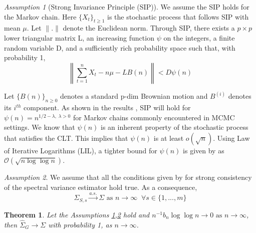 \documentclass[11pt]{article}
\newtheorem{theorem}{Theorem}
\theoremstyle{remark}
\newtheorem{ass}{Assumption}
\begin{document}
\begin{ass}[Strong Invariance Principle (SIP)] \label{ass:sip}
    We assume the SIP holds for the Markov chain. Here $\{X_t\}_{t\geq 1}$ is the stochastic process that follows SIP with mean $\mu$. Let $\|.\|$ denote the Euclidean norm. Through SIP, there exists a $p \times p$ lower triangular matrix L, an increasing function $\psi$ on the integers, a finite random variable D, and a  sufficiently rich probability space such that, with probability 1, \\
  $$\left\|\sum_{t=1}^{n}X_t - n\mu - LB(n)\right\| < D\psi(n)$$
  
  Let $\{B(n)\}_{n\geq 0}$ denotes a standard p-dim Brownian motion and $B^{(i)}$ denotes its $i^{th}$ component. As shown in the results \cite{kuelbs1980almost}, SIP will hold for $\psi(n) = n^{1/2 - \lambda, \; \lambda > 0}$ for Markov chains commonly encountered in MCMC settings. We know that $\psi(n)$ is an inherent property of the stochastic process that satisfies the CLT. This implies that $\psi(n)$ is at least $o(\sqrt{n})$. Using Law of Iterative Logarithms (LIL), a tighter bound for $\psi(n)$ is given by \cite{stra:1964} as $\mathcal{O}(\sqrt{n\log \log n})$.
\end{ass}


\begin{ass} \label{ass:sve_consis} We assume that all the conditions given by \cite{vats:fleg:jon:2018} for strong consistency of the spectral variance estimator hold true. As a consequence, 
\[
\hat{\Sigma}_{S,s} \xrightarrow{a.s.} \Sigma \textrm{ as } n \to \infty \;\; \forall s \in \{1,..., m\}
\]
\end{ass}




\begin{theorem}
\label{th:consistency}
 Let the Assumptions \ref{ass:sip},\ref{ass:sve_consis} hold and $n^{-1}{b_n \log \log n} \to 0 \textrm{ as } n \to \infty$, then $\hat{\Sigma}_{G} \to \Sigma$ with probability 1, as $n \to \infty$.
\end{theorem} 


\end{document}
